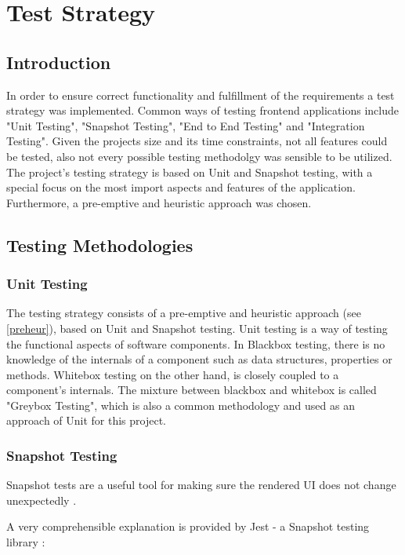 \chapter[Test Strategy]{Test Strategy} \label{ch:testing}

\section{Introduction}
In order to ensure correct functionality and fulfillment of the requirements a test strategy was implemented. Common ways of testing frontend applications include "Unit Testing", "Snapshot Testing", "End to End Testing" and "Integration Testing". Given the projects size and its time constraints, not all features could be tested, also not every possible testing methodolgy was sensible to be utilized. The project's testing strategy is based on Unit and Snapshot testing, with a special focus on the most import aspects and features of the application. Furthermore, a pre-emptive and heuristic approach was chosen. 

\section{Testing Methodologies}

\subsection{Unit Testing}
The testing strategy consists of a pre-emptive and heuristic approach (see \autoref{preheur}), based on Unit and Snapshot testing.
Unit testing is a way of testing the functional aspects of software components. In Blackbox testing, there is no knowledge of the internals of a component such as data structures, properties or methods. Whitebox testing on the other hand, is closely coupled to a component's internals. The mixture between blackbox and whitebox is called "Greybox Testing", which is also a common methodology \cite{spillner2014software} and used as an approach of Unit for this project.

\subsection{Snapshot Testing}
Snapshot tests are a useful tool for making sure the rendered UI does not change unexpectedly \cite{SnapshotJest:online}.

A very comprehensible explanation is provided by Jest - a Snapshot testing library \cite{SnapshotJest:online}:

